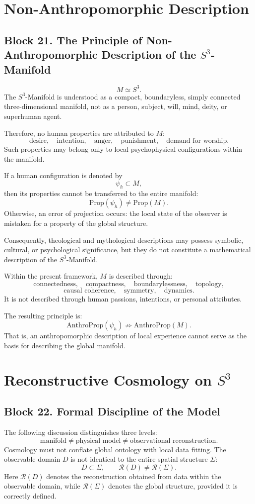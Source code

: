 \documentclass[12pt,a4paper]{article}
\theoremstyle{definition}
\begin{document}
\section{Non-Anthropomorphic Description}
\subsection{Block 21. The Principle of Non-Anthropomorphic Description of the \(S^3\)-Manifold}
\[
M\simeq S^3.
\]
The \(S^3\)-Manifold is understood as a compact, boundaryless, simply connected three-dimensional manifold, not as a person, subject, will, mind, deity, or superhuman agent.

Therefore, no human properties are attributed to \(M\):
\[
\text{desire},\quad
\text{intention},\quad
\text{anger},\quad
\text{punishment},\quad
\text{demand for worship}.
\]
Such properties may belong only to local psychophysical configurations within the manifold.

If a human configuration is denoted by
\[
\psi_h\subset M,
\]
then its properties cannot be transferred to the entire manifold:
\[
\mathrm{Prop}(\psi_h)\neq \mathrm{Prop}(M).
\]
Otherwise, an error of projection occurs: the local state of the observer is mistaken for a property of the global structure.

Consequently, theological and mythological descriptions may possess symbolic, cultural, or psychological significance, but they do not constitute a mathematical description of the \(S^3\)-Manifold.

Within the present framework, \(M\) is described through:
\[
\text{connectedness},\quad
\text{compactness},\quad
\text{boundarylessness},\quad
\text{topology},
\]
\[
\text{causal coherence},\quad
\text{symmetry},\quad
\text{dynamics}.
\]
It is not described through human passions, intentions, or personal attributes.

The resulting principle is:
\[
\mathrm{AnthroProp}(\psi_h)
\not\Rightarrow
\mathrm{AnthroProp}(M).
\]
That is, an anthropomorphic description of local experience cannot serve as the basis for describing the global manifold.



\section{Reconstructive Cosmology on \(S^3\)}
\subsection{Block 22. Formal Discipline of the Model}
The following discussion distinguishes three levels:
\[
\text{manifold}
\neq
\text{physical model}
\neq
\text{observational reconstruction}.
\]
Cosmology must not conflate global ontology with local data fitting. The observable domain \(D\) is not identical to the entire spatial structure \(\Sigma\):
\[
D\subset \Sigma,
\qquad
\mathcal R(D)\neq \mathcal R(\Sigma).
\]
Here \(\mathcal R(D)\) denotes the reconstruction obtained from data within the observable domain, while \(\mathcal R(\Sigma)\) denotes the global structure, provided it is correctly defined.
\end{document}
